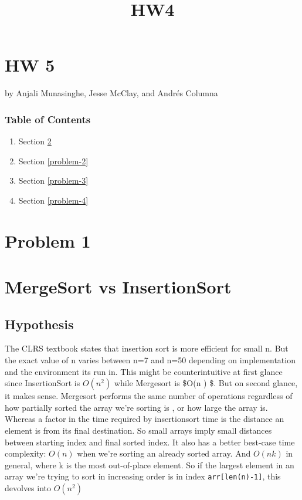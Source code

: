 \documentclass[11pt]{article}
\title{HW4}
\begin{document}
    
    
    \maketitle
    
    

    
    \section{HW 5}\label{hw-5}

by Anjali Munasinghe, Jesse McClay, and Andrés Columna

\subsubsection{Table of Contents}\label{table-of-contents}

\begin{enumerate}
\def\labelenumi{\arabic{enumi}.}
\item
  Section \ref{problem-1}
\item
  Section \ref{problem-2}
\item
  Section \ref{problem-3}
\item
  Section \ref{problem-4}
\end{enumerate}

    \section{Problem 1}\label{problem-1}

\section{MergeSort vs InsertionSort}\label{mergesort-vs-insertionsort}

    \subsection{Hypothesis}\label{hypothesis}

The CLRS textbook states that insertion sort is more efficient for small
n. But the exact value of n varies between n=7 and n=50 depending on
implementation and the environment its run in. This might be
counterintuitive at first glance since InsertionSort is \(O(n^2)\) while
Mergesort is \$O(n ) \$. But on second glance, it makes sense.
Mergesort performs the same number of operations regardless of how
partially sorted the array we're sorting is , or how large the array is.
Whereas a factor in the time required by insertionsort time is the
distance an element is from its final destination. So small arrays imply
small distances between starting index and final sorted index. It also
has a better best-case time complexity: \(O(n)\) when we're sorting an
already sorted array. And \(O(nk)\) in general, where k is the most
out-of-place element. So if the largest element in an array we're trying
to sort in increasing order is in index \texttt{arr{[}len(n)-1{]}}, this
devolves into \(O(n^2)\)
\end{document}
